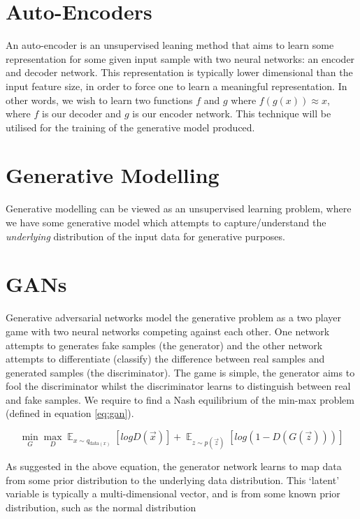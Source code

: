 \documentclass{report}
\DeclareMathOperator{\E}{\mathbb{E}}
\theoremstyle{plain}
\theoremstyle{definition}
\theoremstyle{remark}
\numberwithin{equation}{section}
\numberwithin{figure}{section}
\newcommand{\<}{\langle}
\renewcommand{\>}{\rangle}
\begin{document}
\section{Auto-Encoders}
An auto-encoder \cite{goodfellow_deep_2016} is an unsupervised leaning method that aims to learn some representation for some given input sample with two neural networks: an encoder and decoder network. This representation is typically lower dimensional than the input feature size, in order to force one to learn a meaningful representation. In other words, we wish to learn two functions $f$ and $g$ where $f(g(x)) \approx x$, where $f$ is our decoder and $g$ is our encoder network. This technique will be utilised for the training of the generative model produced.

\section{Generative Modelling}

Generative modelling can be viewed as an unsupervised learning problem, where we have some generative model which attempts to capture/understand the \textit{underlying} distribution of the input data for generative purposes.

\section{GANs}
Generative adversarial networks \cite{goodfellow_generative_2014} model the generative problem as a two player game with two neural networks competing against each other. One network attempts to generates fake samples (the generator) and the other network attempts to differentiate (classify) the difference between real samples and generated samples (the discriminator). The game is simple, the generator aims to fool the discriminator whilst the discriminator learns to distinguish between real and fake samples. We require to find a Nash equilibrium of the min-max problem (defined in equation \eqref{eq:gan}). 

\begin{equation}
\label{eq:gan}
    \min_{G} \max_{D} \E_{x \sim q_{\text{data}(x)}}[log D(\vec{x})] + \E_{z \sim p(\vec{z})} [ log(1 - D(G(\vec{z}))) ]
\end{equation}

As suggested in the above equation, the generator network learns to map data from some prior distribution to the underlying data distribution. This `latent' variable is typically a multi-dimensional vector, and is from some known prior distribution, such as the normal distribution
\end{document}
